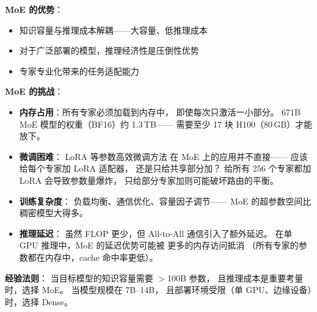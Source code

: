 \begin{corebox}
\textbf{MoE 的优势}：
\begin{itemize}[noitemsep]
  \item 知识容量与推理成本解耦——大容量、低推理成本
  \item 对于广泛部署的模型，推理经济性是压倒性优势
  \item 专家专业化带来的任务适配能力
\end{itemize}

\textbf{MoE 的挑战}：
\begin{itemize}[noitemsep]
  \item \textbf{内存占用}：所有专家必须加载到内存中，
        即使每次只激活一小部分。
        671B MoE 模型的权重（BF16）约 1.3\,TB——
        需要至少 17 块 H100（80\,GB）才能放下。
  \item \textbf{微调困难}：
        LoRA 等参数高效微调方法
        在 MoE 上的应用并不直接——
        应该给每个专家加 LoRA 适配器，
        还是只给共享部分加？
        给所有 256 个专家都加 LoRA 会导致参数量爆炸，
        只给部分专家加则可能破坏路由的平衡。
  \item \textbf{训练复杂度}：
        负载均衡、通信优化、容量因子调节——
        MoE 的超参数空间比稠密模型大得多。
  \item \textbf{推理延迟}：
        虽然 FLOP 更少，但 All-to-All 通信引入了额外延迟。
        在单 GPU 推理中，MoE 的延迟优势可能被
        更多的内存访问抵消
        （所有专家的参数都在内存中，cache 命中率更低）。
\end{itemize}

\textbf{经验法则}：
当目标模型的知识容量需要 $>$100B 参数，
且推理成本是重要考量时，选择 MoE。
当模型规模在 7B--14B，
且部署环境受限（单 GPU、边缘设备）时，选择 Dense。
\end{corebox}

